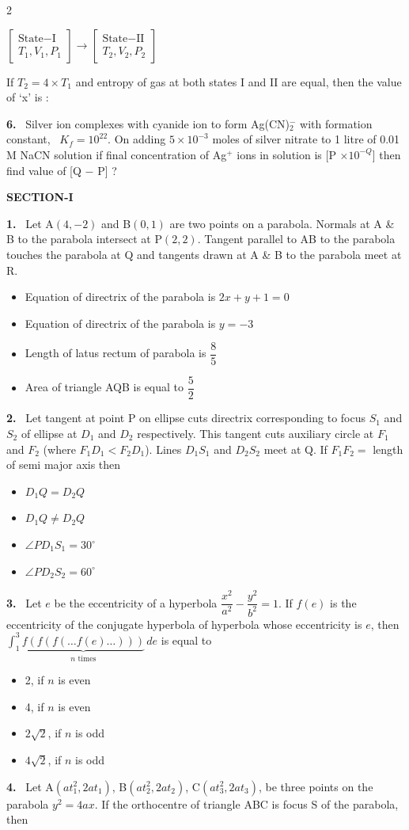 \documentclass[10pt]{extarticle}
\newcommand{\partsec}[2]{\par\medskip\noindent{\large\bfseries PART-#1: #2}\par\smallskip}
\newcommand{\sect}[1]{\par\smallskip\noindent\textbf{#1}\par}
\newcommand{\qn}[1]{\par\smallskip\noindent\textbf{#1.}~}
\newenvironment{qoptions}{\begin{itemize}[leftmargin=1.8em,itemsep=1pt,topsep=2pt,label={}]}{\end{itemize}}
\newcommand{\opt}[2]{\item[(#1)] #2}
\begin{document}
\begin{multicols}{2}
\begin{center}
$\left[\begin{array}{c}\text{State}-\text{I}\\ T_1,V_1,P_1\end{array}\right]\longrightarrow\left[\begin{array}{c}\text{State}-\text{II}\\ T_2,V_2,P_2\end{array}\right]$
\end{center}
If $T_2=4\times T_1$ and entropy of gas at both states I and II are equal, then the value of `x' is :
\qn{6} Silver ion complexes with cyanide ion to form Ag(CN)$_2^-$ with formation constant, \ $K_f=10^{22}$. On adding $5\times10^{-3}$ moles of silver nitrate to 1 litre of 0.01 M NaCN solution if final concentration of Ag$^+$ ions in solution is [P $\times10^{-Q}$] then find value of [Q $-$ P] ?
\partsec{3}{MATHEMATICS}
\sect{SECTION-I}
\qn{1} Let A$(4,-2)$ and B$(0,1)$ are two points on a parabola. Normals at A \& B to the parabola intersect at P$(2,2)$. Tangent parallel to AB to the parabola touches the parabola at Q and tangents drawn at A \& B to the parabola meet at R.
\begin{qoptions}
\opt{A}{Equation of directrix of the parabola is $2x+y+1=0$}
\opt{B}{Equation of directrix of the parabola is $y=-3$}
\opt{C}{Length of latus rectum of parabola is $\dfrac85$}
\opt{D}{Area of triangle AQB is equal to $\dfrac52$}
\end{qoptions}
\qn{2} Let tangent at point P on ellipse cuts directrix corresponding to focus $S_1$ and $S_2$ of ellipse at $D_1$ and $D_2$ respectively. This tangent cuts auxiliary circle at $F_1$ and $F_2$ (where $F_1D_1<F_2D_1$). Lines $D_1S_1$ and $D_2S_2$ meet at Q. If $F_1F_2=$ length of semi major axis then
\begin{qoptions}
\opt{A}{$D_1Q=D_2Q$}
\opt{B}{$D_1Q\neq D_2Q$}
\opt{C}{$\angle PD_1S_1=30^\circ$}
\opt{D}{$\angle PD_2S_2=60^\circ$}
\end{qoptions}
\qn{3} Let $e$ be the eccentricity of a hyperbola $\dfrac{x^2}{a^2}-\dfrac{y^2}{b^2}=1$. If $f(e)$ is the eccentricity of the conjugate hyperbola of hyperbola whose eccentricity is $e$, then $\displaystyle\int_1^3\underbrace{f(f(f(\ldots f(e)\ldots)))}_{n\text{ times}}\,de$ is equal to
\begin{qoptions}
\opt{A}{2, if $n$ is even}
\opt{B}{4, if $n$ is even}
\opt{C}{$2\sqrt2$, if $n$ is odd}
\opt{D}{$4\sqrt2$, if $n$ is odd}
\end{qoptions}
\qn{4} Let A$(at_1^2,2at_1)$, B$(at_2^2,2at_2)$, C$(at_3^2,2at_3)$, be three points on the parabola $y^2=4ax$. If the orthocentre of triangle ABC is focus S of the parabola, then

\end{multicols}
\end{document}
